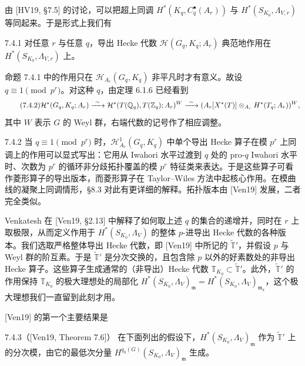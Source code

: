 由 [HV19, §7.5] 的讨论，可以把超上同调 $H^*(K_q,C^\bullet_q(A_r))$ 与 $H^*(S_{K_0},\Lambda_{V,r})$ 等同起来。于是形式上我们有

\begin{prop}{7.4.1}\label{thm:a6-05-5}
对任意 $r$ 与任意 $q$，导出 Hecke 代数 $\mathcal H(G_q,K_q;A_r)$ 典范地作用在 $H^*(S_{K_0},\Lambda_{V,r})$ 上。
\end{prop}

命题 7.4.1 中的作用只在 $\mathcal H_{A_r}(G_q,K_q)$ 非平凡时才有意义。故设 $q\equiv1\pmod{p^r}$。对这种 $q$，由定理 6.1.6 已经看到
\begin{equation}\tag{7.4.2}\label{eq:a6-05-5}
\mathcal H^*(G_q,K_q;A_r)\xrightarrow{\ \sim\ }\mathcal H^*(T(\mathbb{Q}_q),T(\mathbb{Z}_q);A_r)^W\xrightarrow{\ \sim\ }(A_r[X^*(T)]\otimes_{A_r}H^*(T_q;A_r))^W,
\end{equation}
其中 $W$ 表示 $G$ 的 Weyl 群，右端代数的记号作了相应调整。

\begin{rem}{7.4.2}\label{thm:a6-05-6}
当 $q\equiv1\pmod{p^r}$ 时，$\mathcal H^1_{A_r}(G_q,K_q)$ 中单个导出 Hecke 算子在模 $p^r$ 上同调上的作用可以显式写出：它用从 Iwahori 水平过渡到 $q$ 处的 pro-$q$ Iwahori 水平时、次数为 $p^r$ 的循环非分歧拓扑覆盖的模 $p^r$ 特征类来表达。于是这些算子可看作菱形算子的导出版本，而菱形算子在 Taylor--Wiles 方法中起核心作用。在模曲线的凝聚上同调情形，§8.3 对此有更详细的解释。拓扑版本由 [Ven19] 发展，二者完全类似。
\end{rem}

Venkatesh 在 [Ven19, §2.13] 中解释了如何取上述 $q$ 的集合的递增并，同时在 $r$ 上取极限，从而定义作用于 $H^*(S_{K_0},\Lambda_V)$ 的整体 $p$-进导出 Hecke 代数的各种版本。我们选取严格整体导出 Hecke 代数，即 [Ven19] 中所记的 $\widetilde{\mathbb T}'$，并假设 $p$ 与 Weyl 群的阶互素。于是 $\widetilde{\mathbb T}'$ 是分次交换的，且包含除 $p$ 以外的好素数处的非导出 Hecke 算子。这些算子生成通常的（非导出）Hecke 代数 $\mathbb T_{K_0}\subset\widetilde{\mathbb T}'$。此外，$\widetilde{\mathbb T}'$ 的作用保持 $\mathbb T_{K_0}$ 的极大理想处的局部化 $H^*(S_{K_0},\Lambda_V)_{\mathfrak m}=H^*(S_{K_0},\Lambda_V)_{\mathfrak m_\pi}$，这个极大理想我们一直留到此刻才用。

[Ven19] 的第一个主要结果是

\begin{thm}{7.4.3}（[Ven19, Theorem 7.6]）\label{thm:a6-05-7}
在下面列出的假设下，$H^*(S_{K_0},\Lambda_V)_{\mathfrak m}$ 作为 $\widetilde{\mathbb T}'$ 上的分次模，由它的最低次分量 $H^{q_0(G)}(S_{K_0},\Lambda_V)_{\mathfrak m}$ 生成。
\end{thm}


